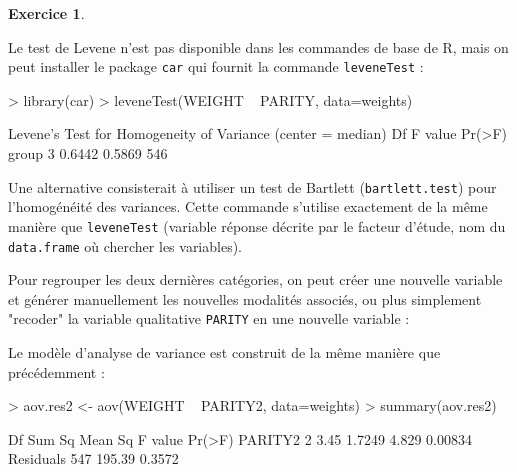 \documentclass[11pt]{report}
\theoremstyle{definition}
\newtheorem{exo}{Exercice}[chapter]
\begin{document}
\begin{exo}
\begin{sol}
Le test de Levene n'est pas disponible dans les commandes de base de R, mais
on peut installer le package \texttt{car} qui fournit la commande
\texttt{leveneTest} :
\begin{Schunk}
\begin{Sinput}
> library(car)
> leveneTest(WEIGHT ~ PARITY, data=weights)
\end{Sinput}
\begin{Soutput}
Levene's Test for Homogeneity of Variance (center = median)
       Df F value Pr(>F)
group   3  0.6442 0.5869
      546               
\end{Soutput}
\end{Schunk}
Une alternative consisterait à utiliser un test de Bartlett
(\texttt{bartlett.test}) pour l'homogénéité des variances. Cette commande
s'utilise exactement de la même manière que \texttt{leveneTest} (variable
réponse décrite par le facteur d'étude, nom du \texttt{data.frame} où
chercher les variables).

Pour regrouper les deux dernières catégories, on peut créer une nouvelle
variable et générer manuellement les nouvelles modalités associés, ou plus
simplement "recoder" la variable qualitative \texttt{PARITY} en une nouvelle
variable :
\begin{Schunk}
\end{Schunk}
Le modèle d'analyse de variance est construit de la même manière que
précédemment :
\begin{Schunk}
\begin{Sinput}
> aov.res2 <- aov(WEIGHT ~ PARITY2, data=weights)
> summary(aov.res2)
\end{Sinput}
\begin{Soutput}
             Df Sum Sq Mean Sq F value  Pr(>F)
PARITY2       2   3.45  1.7249   4.829 0.00834
Residuals   547 195.39  0.3572                
\end{Soutput}
\end{Schunk}


\end{sol}
\end{exo}
\end{document}
